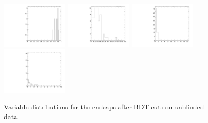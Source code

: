 \begin{figure}
  \includegraphics[width=0.3\textwidth]{Figures/AfterBDTCut_iso_EndcapsUnblinded.pdf}
  \includegraphics[width=0.3\textwidth]{Figures/AfterBDTCut_docatrk_EndcapsUnblinded.pdf}
  \includegraphics[width=0.3\textwidth]{Figures/AfterBDTCut_closetrk_EndcapsUnblinded.pdf}
  \includegraphics[width=0.3\textwidth]{Figures/AfterBDTCut_chi2dof_EndcapsUnblinded.pdf}
  \caption{Variable distributions for the endcaps after BDT cuts on unblinded data.}
  \label{fig:massPlotUnblinded}
\end{figure}
